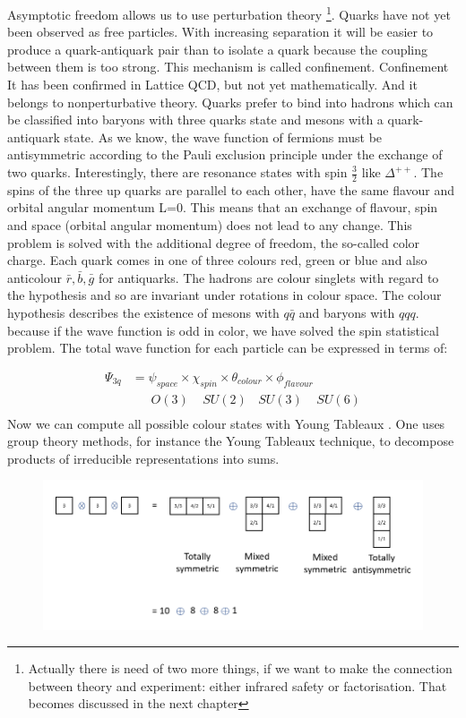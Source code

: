 Asymptotic freedom allows us to use perturbation theory \footnote{Actually there is need of two more things, if we want to make the connection between theory and experiment: either infrared safety or factorisation. That becomes discussed in the next chapter}.
Quarks have not yet been observed as free particles. With increasing separation it will be easier to produce a quark-antiquark pair than to isolate a quark because the coupling between them is too strong. This mechanism is called confinement. Confinement It has been confirmed in Lattice QCD, but not yet mathematically. And it belongs to  nonperturbative theory.
Quarks prefer to bind into hadrons which can be classified into baryons with three quarks state and mesons with a quark-antiquark state.
As we know, the wave function of fermions must be antisymmetric according to the Pauli exclusion principle under the exchange of two quarks. Interestingly, there are resonance states with spin $ \frac{3}{2} $ like $ {\Delta}^{++} $.
The spins of the three up quarks are parallel to each other, have the same flavour and orbital angular momentum L=0. This means that an exchange of flavour, spin and space (orbital angular momentum) does not lead to any change. This problem is solved with the additional degree of freedom, the so-called color charge. Each quark comes in one of three colours red, green or blue and also anticolour $ \bar{r}, \bar{b}, \bar{g} $ for antiquarks. The hadrons are colour singlets with regard to the hypothesis and so are invariant under rotations in colour space. The colour hypothesis describes the existence of mesons with $ q \bar{q} $ and baryons with $ qqq $. because if the wave function is odd in color, we have solved the spin statistical problem.
The total wave function for each particle can be expressed in terms of:

\begin{equation}
\begin{split}
\Psi_{3q} &= \psi_{space} \times \chi_{spin} \times \theta_{colour} \times \phi_{flavour} \\
&\:\:\:\:\:\:\:O(3) \:\:\:\:\: SU(2)\:\:\:\: SU(3)\:\:\:\:\: SU(6)\\
\end{split}
\end{equation}
Now we can compute all possible colour states with Young Tableaux \cite{Greiner1989}. One uses group theory methods, for instance the Young Tableaux technique, to decompose products of irreducible representations into sums.
\begin{figure}[h!]
\centering
\includegraphics[scale=0.7]{images/Intro/Young.png}
\end{figure}

